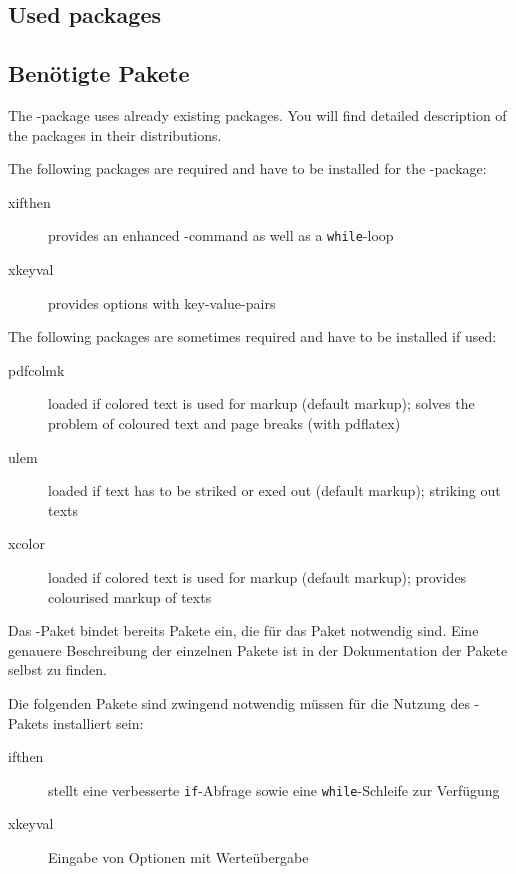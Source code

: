 \ifENGLISH
	\subsection{Used packages}
\fi
	\ifGERMAN
		\subsection{Benötigte Pakete}
	\fi
\label{sec:user:packages}

\ifENGLISH
	The -package uses already existing packages.
	You will find detailed description of the packages in their distributions.

	The following packages are required and have to be installed for the -package:
	\begin{description}
		\item [xifthen] provides an enhanced -command as well as a \texttt{while}-loop
		\item [xkeyval] provides options with key-value-pairs
	\end{description}

	The following packages are sometimes required and have to be installed if used:
	\begin{description}
		\item [pdfcolmk] loaded if colored text is used for markup (default markup); solves the problem of coloured text and page breaks (with pdflatex)
		\item [ulem] loaded if text has to be striked or exed out (default markup); striking out texts
		\item [xcolor] loaded if colored text is used for markup (default markup); provides colourised markup of texts
	\end{description}
\fi
	\ifGERMAN
		Das -Paket bindet bereits Pakete ein, die für das Paket notwendig sind.
		Eine genauere Beschreibung der einzelnen Pakete ist in der Dokumentation der Pakete selbst zu finden.

		Die folgenden Pakete sind zwingend notwendig müssen für die Nutzung des -Pakets installiert sein:
		\begin{description}
			\item [ifthen] stellt eine verbesserte \texttt{if}-Abfrage sowie eine \texttt{while}-Schleife zur Verfügung
			\item [xkeyval] Eingabe von Optionen mit Werteübergabe
		\end{description}

